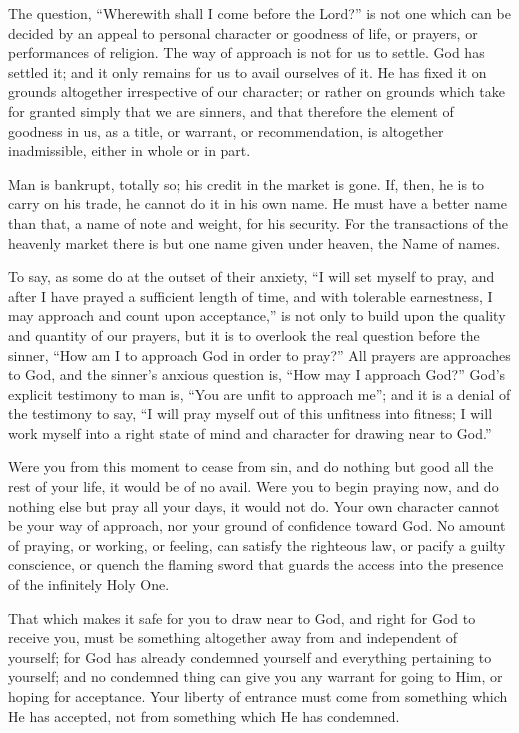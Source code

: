 \documentclass[
]{book}
\begin{document}
The question, ``Wherewith shall I come before the Lord?'' is not one which can be decided by an appeal to personal character or goodness of life, or prayers, or performances of religion. The way of approach is not for us to settle. God has settled it; and it only remains for us to avail ourselves of it. He has fixed it on grounds altogether irrespective of our character; or rather on grounds which take for granted simply that we are sinners, and that therefore the element of goodness in us, as a title, or warrant, or recommendation, is altogether inadmissible, either in whole or in part.

Man is bankrupt, totally so; his credit in the market is gone. If, then, he is to carry on his trade, he cannot do it in his own name. He must have a better name than that, a name of note and weight, for his security. For the transactions of the heavenly market there is but one name given under heaven, the Name of names.

To say, as some do at the outset of their anxiety, ``I will set myself to pray, and after I have prayed a sufficient length of time, and with tolerable earnestness, I may approach and count upon acceptance,'' is not only to build upon the quality and quantity of our prayers, but it is to overlook the real question before the sinner, ``How am I to approach God in order to pray?'' All prayers are approaches to God, and the sinner's anxious question is, ``How may I approach God?'' God's explicit testimony to man is, ``You are unfit to approach me''; and it is a denial of the testimony to say, ``I will pray myself out of this unfitness into fitness; I will work myself into a right state of mind and character for drawing near to God.''

Were you from this moment to cease from sin, and do nothing but good all the rest of your life, it would be of no avail. Were you to begin praying now, and do nothing else but pray all your days, it would not do. Your own character cannot be your way of approach, nor your ground of confidence toward God. No amount of praying, or working, or feeling, can satisfy the righteous law, or pacify a guilty conscience, or quench the flaming sword that guards the access into the presence of the infinitely Holy One.

That which makes it safe for you to draw near to God, and right for God to receive you, must be something altogether away from and independent of yourself; for God has already condemned yourself and everything pertaining to yourself; and no condemned thing can give you any warrant for going to Him, or hoping for acceptance. Your liberty of entrance must come from something which He has accepted, not from something which He has condemned.
\end{document}
